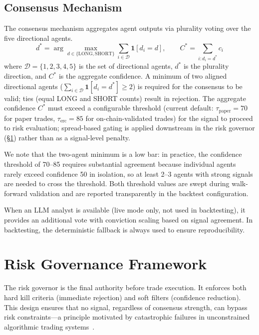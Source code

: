 \documentclass{article}
\begin{document}
\subsection{Consensus Mechanism}

The consensus mechanism aggregates agent outputs via plurality voting over the five directional agents.
\begin{equation}
  d^* = \arg\max_{d \in \{\text{LONG}, \text{SHORT}\}} \sum_{i \in \mathcal{D}} \mathbf{1}[d_i = d], \qquad
  C^* = \sum_{i: d_i = d^*} c_i
  \label{eq:consensus}
\end{equation}
where $\mathcal{D} = \{1, 2, 3, 4, 5\}$ is the set of directional agents, $d^*$ is the plurality direction, and $C^*$ is the aggregate confidence.
A minimum of two aligned directional agents ($\sum_{i \in \mathcal{D}} \mathbf{1}[d_i = d^*] \geq 2$) is required for the consensus to be valid; ties (equal LONG and SHORT counts) result in rejection.
The aggregate confidence $C^*$ must exceed a configurable threshold (current default: $\tau_{\text{paper}} = 70$ for paper trades, $\tau_{\text{erc}} = 85$ for on-chain-validated trades) for the signal to proceed to risk evaluation; spread-based gating is applied downstream in the risk governor (\S\ref{sec:risk}) rather than as a signal-level penalty.
\label{sec:consensus}

We note that the two-agent minimum is a low bar: in practice, the confidence threshold of 70--85 requires substantial agreement because individual agents rarely exceed confidence 50 in isolation, so at least 2--3 agents with strong signals are needed to cross the threshold.
Both threshold values are swept during walk-forward validation and are reported transparently in the backtest configuration.

When an LLM analyst is available (live mode only, not used in backtesting), it provides an additional vote with conviction scaling based on signal agreement.
In backtesting, the deterministic fallback is always used to ensure reproducibility.

\section{Risk Governance Framework}
\label{sec:risk}

The risk governor is the final authority before trade execution.
It enforces both hard kill criteria (immediate rejection) and soft filters (confidence reduction).
This design ensures that no signal, regardless of consensus strength, can bypass risk constraints---a principle motivated by catastrophic failures in unconstrained algorithmic trading systems~\citep{LopezDePrado2018}.
\end{document}
